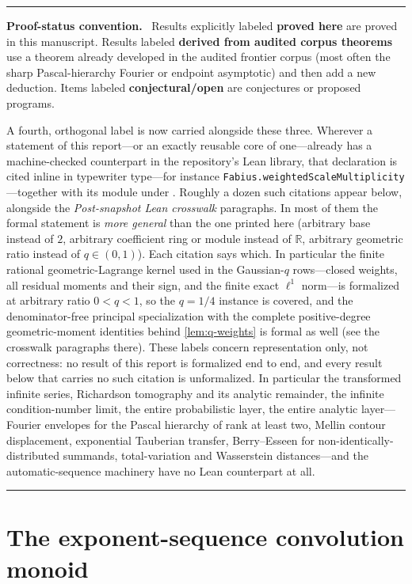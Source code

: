 \documentclass[11pt,oneside]{article}
\numberwithin{equation}{section}
\theoremstyle{definition}
\theoremstyle{remark}
\newcommand{\R}{\mathbb R}
\newcommand{\statusproved}{\textcolor{deepgreen}{\textbf{proved here}}}
\newcommand{\statusderived}{\textcolor{linkblue}{\textbf{derived from audited corpus theorems}}}
\newcommand{\statusopen}{\textcolor{deepred}{\textbf{conjectural/open}}}
\newcommand{\lean}[1]{%
  \ifmmode\text{\texttt{\detokenize{#1}}}\else\nolinkurl{#1}\fi}
\newenvironment{statusbox}[1]{%
  \par\medskip\noindent\begin{center}\begin{minipage}{0.94\textwidth}%
  \color{linkblue}\hrule\vspace{0.65em}%
  \color{black}\textbf{\color{linkblue}#1.}\ }{%
  \par\vspace{0.65em}\color{linkblue}\hrule
  \end{minipage}\end{center}\medskip}
\begin{document}
\begin{statusbox}{Proof-status convention}
Results explicitly labeled \statusproved{} are proved in this manuscript.  Results labeled
\statusderived{} use a theorem already developed in the audited frontier corpus (most often
the sharp Pascal-hierarchy Fourier or endpoint asymptotic) and then add a new deduction.
Items labeled \statusopen{} are conjectures or proposed programs.

A fourth, orthogonal label is now carried alongside these three.  Wherever a statement of this
report---or an exactly reusable core of one---already has a machine-checked counterpart in the
repository's Lean library, that declaration is cited inline in typewriter type---for instance
\lean{Fabius.weightedScaleMultiplicity}---together with its module under
.  Roughly a dozen such citations appear
below, alongside the \emph{Post-snapshot Lean crosswalk} paragraphs.  In most of them the
formal statement is \emph{more general} than the one printed here
(arbitrary base instead of $2$, arbitrary coefficient ring or module instead of $\R$, arbitrary
geometric ratio instead of $q\in(0,1)$).  Each citation says which.  In particular the finite
rational geometric-Lagrange kernel used in the Gaussian-$q$ rows---closed weights, all
residual moments and their sign, and the finite exact $\ell^1$ norm---is formalized at
arbitrary ratio $0<q<1$, so the $q=1/4$ instance is covered, and the denominator-free
principal specialization with the complete positive-degree geometric-moment identities behind
\cref{lem:q-weights} is formal as well (see the crosswalk paragraphs there).  These labels
concern representation only, not correctness: no result of this report is formalized end
to end, and every result below that carries no such citation is unformalized.  In particular
the transformed infinite series, Richardson tomography and its analytic remainder, the
infinite condition-number limit, the entire probabilistic layer, the entire analytic
layer---Fourier envelopes for the Pascal hierarchy of rank at least two, Mellin contour
displacement, exponential Tauberian transfer, Berry--Esseen for non-identically-distributed
summands, total-variation and Wasserstein distances---and the automatic-sequence machinery
have no Lean counterpart at all.
\end{statusbox}

\section{The exponent-sequence convolution monoid}
\label{sec:master}
\end{document}
